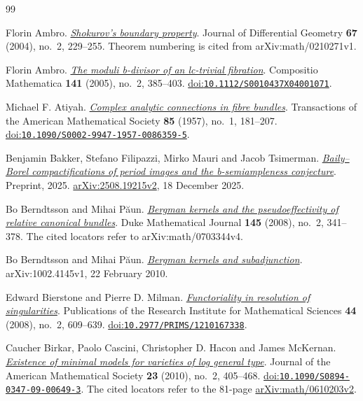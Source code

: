 \begin{thebibliography}{99}

Florin Ambro.
\emph{\href{https://arxiv.org/abs/math/0210271v1}{{Shokurov}'s boundary property}}.
Journal of Differential Geometry \textbf{67} (2004), no.~2, 229--255.
Theorem numbering is cited from arXiv:math/0210271v1.

Florin Ambro.
\emph{\href{https://doi.org/10.1112/S0010437X04001071}{The moduli b-divisor of an lc-trivial fibration}}.
Compositio Mathematica \textbf{141} (2005), no.~2, 385--403.
\href{https://doi.org/10.1112/S0010437X04001071}{doi:\nolinkurl{10.1112/S0010437X04001071}}.

Michael F. Atiyah.
\emph{\href{https://doi.org/10.1090/S0002-9947-1957-0086359-5}{Complex analytic connections in fibre bundles}}.
Transactions of the American Mathematical Society \textbf{85} (1957), no.~1, 181--207.
\href{https://doi.org/10.1090/S0002-9947-1957-0086359-5}{doi:\nolinkurl{10.1090/S0002-9947-1957-0086359-5}}.

Benjamin Bakker, Stefano Filipazzi, Mirko Mauri and Jacob Tsimerman.
\emph{\href{https://arxiv.org/abs/2508.19215v2}{{Baily--Borel} compactifications of period images and the b-semiampleness conjecture}}.
Preprint, 2025.
\href{https://arxiv.org/abs/2508.19215v2}{arXiv:2508.19215v2}, 18 December 2025.

Bo Berndtsson and Mihai P{\u a}un.
\emph{\href{https://arxiv.org/abs/math/0703344v4}
{Bergman kernels and the pseudoeffectivity of relative canonical bundles}}.
Duke Mathematical Journal \textbf{145} (2008), no.~2, 341--378.
The cited locators refer to arXiv:math/0703344v4.

Bo Berndtsson and Mihai P{\u a}un.
\emph{\href{https://arxiv.org/abs/1002.4145v1}
{Bergman kernels and subadjunction}}.
arXiv:1002.4145v1, 22 February 2010.

Edward Bierstone and Pierre D. Milman.
\emph{\href{https://ems.press/journals/prims/articles/2154}{Functoriality in resolution of singularities}}.
Publications of the Research Institute for Mathematical Sciences \textbf{44} (2008), no.~2, 609--639.
\href{https://doi.org/10.2977/PRIMS/1210167338}{doi:\nolinkurl{10.2977/PRIMS/1210167338}}.

Caucher Birkar, Paolo Cascini, Christopher D. Hacon and James McKernan.
\emph{\href{https://arxiv.org/abs/math/0610203v2}{Existence of minimal models for varieties of log general type}}.
Journal of the American Mathematical Society \textbf{23} (2010), no.~2, 405--468.
\href{https://doi.org/10.1090/S0894-0347-09-00649-3}{doi:\nolinkurl{10.1090/S0894-0347-09-00649-3}}.
The cited locators refer to the 81-page \href{https://arxiv.org/abs/math/0610203v2}{arXiv:math/0610203v2}.


\end{thebibliography}
